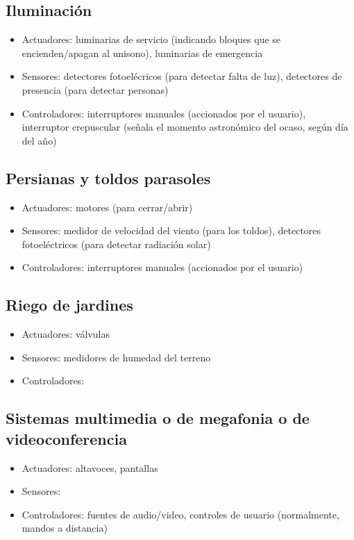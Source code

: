 \documentclass[spanish,10pt,a4paper,final,oneside]{article}
\begin{document}
\subsection{Iluminación}
\begin{itemize}
\item Actuadores: luminarias de servicio (indicando bloques que se encienden/apagan al unisono), luminarias de emergencia
\item Sensores: detectores fotoelécricos (para detectar falta de luz), detectores de presencia (para detectar personas)
\item Controladores: interruptores manuales (accionados por el usuario), interruptor crepuscular (señala el momento astronómico del ocaso, según día del año)
\end{itemize}

\subsection{Persianas y toldos parasoles}
\begin{itemize}
\item Actuadores: motores (para cerrar/abrir)
\item Sensores: medidor de velocidad del viento (para los toldos),  detectores fotoeléctricos (para detectar radiación solar)
\item Controladores: interruptores manuales (accionados por el usuario)
\end{itemize}

\subsection{Riego de jardines}
\begin{itemize}
\item Actuadores: válvulas
\item Sensores: medidores de humedad del terreno
\item Controladores: 
\end{itemize}

\subsection{Sistemas multimedia o de megafonia o de videoconferencia}
\begin{itemize}
\item Actuadores: altavoces, pantallas
\item Sensores:
\item Controladores: fuentes de audio/video, controles de usuario (normalmente, mandos a distancia)
\end{itemize}
\end{document}

